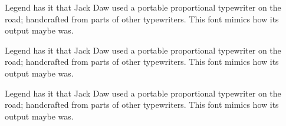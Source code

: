 \documentclass{article}
\begin{document}
\setmainfont{Jackwrite.ttf}
Legend has it that Jack Daw used a portable proportional
typewriter on the road; handcrafted from parts of other
typewriters. This font mimics how its output maybe was.

\setmainfont{JackwriteBold.ttf}
Legend has it that Jack Daw used a portable proportional
typewriter on the road; handcrafted from parts of other
typewriters. This font mimics how its output maybe was.

\setmainfont{JackwriteThin.ttf}
Legend has it that Jack Daw used a portable proportional
typewriter on the road; handcrafted from parts of other
typewriters. This font mimics how its output maybe was.
\end{document}
